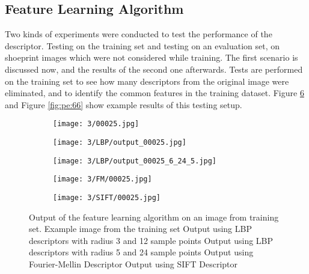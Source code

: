 \documentclass[draft,final]{vutinfth} %
\begin{document}
\subsection{Feature Learning Algorithm}
\par
Two kinds of experiments were conducted to test the performance of the descriptor.
Testing on the training set and testing on an evaluation set, on shoeprint images which were not considered while training.
The first scenario is discussed now, and the results of the second one afterwards.
Tests are performed on the training set to see how many descriptors from the original image were eliminated, and to identify the common features in the training dataset.
Figure \ref{fig:pe:25} and Figure \ref{fig:pe:66} show example results of this testing setup.

\begin{figure}[h]
  \centering
  \begin{subfigure}[t]{0.19\columnwidth}
    \centering
    \texttt{[image: 3/00025.jpg]}
    \subcaption{}
    \label{fig:pe:25:orig}
  \end{subfigure}
  \begin{subfigure}[t]{0.19\columnwidth}
    \centering
    \texttt{[image: 3/LBP/output\_00025.jpg]}
    \subcaption{}
    \label{fig:pe:25:LBPs}
  \end{subfigure}
  \begin{subfigure}[t]{0.19\columnwidth}
    \centering
    \texttt{[image: 3/LBP/output\_00025\_6\_24\_5.jpg]}
    \subcaption{}
    \label{fig:pe:25:LBPb}
  \end{subfigure}
  \begin{subfigure}[t]{0.19\columnwidth}
    \centering
    \texttt{[image: 3/FM/00025.jpg]}
    \subcaption{}
    \label{fig:pe:25:FM}
  \end{subfigure}
  \begin{subfigure}[t]{0.19\columnwidth}
    \centering
    \texttt{[image: 3/SIFT/00025.jpg]}
    \subcaption{}
    \label{fig:pe:25:SIFT}
  \end{subfigure}
  \caption{Output of the feature learning algorithm on an image from training set. Example image from the training set  Output using LBP descriptors with radius 3 and 12 sample points  Output using LBP descriptors with radius 5 and 24 sample points  Output using Fourier-Mellin Descriptor  Output using SIFT Descriptor}
  \label{fig:pe:25}
\end{figure}
\end{document}
